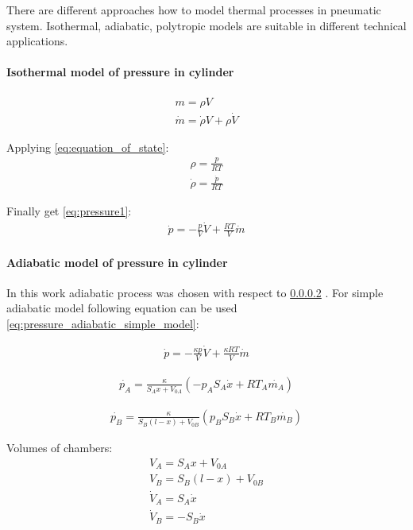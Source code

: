 \documentclass[class=article, crop=false]{standalone}
\begin{document}
There are different approaches how to model thermal processes in pneumatic
system. Isothermal, adiabatic, polytropic models are suitable in different
technical applications. 


\paragraph{Isothermal model of pressure in cylinder}

\begin{align}
    m = \rho V \\
    \dot{m} = \dot{\rho} V + \rho \dot{V}
\end{align}

Applying \ref{eq:equation_of_state}:
\begin{align}
    \rho = \frac{p}{RT} \\
    \dot{\rho} = \frac{\dot{p}}{RT} 
\end{align}

Finally get \ref{eq:pressure1}:
\begin{align}
    \dot{p} = - \frac{p}{V}\dot{V} + \frac{RT}{V}\dot{m}
    \label{eq:pressure1}
\end{align}


\paragraph{Adiabatic model of pressure in cylinder} 
In this work adiabatic process was chosen with
respect to \ref{} .
For simple adiabatic model following equation can be used
\ref{eq:pressure_adiabatic_simple_model}:

\begin{align}
    \dot{p} = - \frac{\kappa p}{V}\dot{V} + \frac{\kappa RT}{V}\dot{m}
    \label{eq:pressure_adiabatic_simple_model}
\end{align}

\begin{align}
    \dot{p_A} = \frac{\kappa}{S_A x + V_{0A}} \left(- p_A S_A\dot{x} + RT_A\dot{m_A}
    \right)
\end{align}

\begin{align}
    \dot{p_B} = \frac{\kappa}{S_B (l-x) + V_{0B}} \left(p_B S_B\dot{x} + RT_B\dot{m_B}
    \right)
\end{align}

Volumes of chambers:
\begin{align}
    V_A = S_A x + V_{0A} \\
    V_B = S_B (l-x) + V_{0B} \\
    \dot{V}_A = S_A \dot{x} \\
    \dot{V}_B = - S_B \dot{x}
\end{align}
\end{document}
